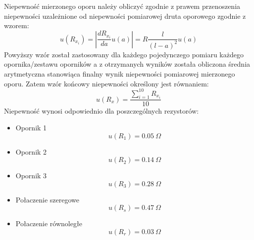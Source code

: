\documentclass[a4paper,12pts]{article}
\begin{document}
	Niepewność mierzonego oporu należy obliczyć zgodnie z prawem przenoszenia niepewności uzależnione od niepewności pomiarowej druta oporowego zgodnie z wzorem:
	\begin{equation}
		u(R_{{x}_i}) = \left| \frac{dR_{{x}_i}}{da} u(a) \right| = R \frac{l}{(l-a)^2} u(a)
	\end{equation}
	Powyższy wzór został zastosowany dla każdego pojedynczego pomiaru każdego opornika/zestawu oporników a z otrzymanych wyników została obliczona średnia arytmetyczna stanowiąca finalny wynik niepewności pomiarowej mierzonego oporu. Zatem wzór końcowy niepewności określony jest równaniem:
	\begin{equation}
		u(R_x) = \frac{\sum_{i = 1}^{10} R_{{x}_i}}{10}
	\end{equation}
	Niepewność wynosi odpowiednio dla poszczególnych rezystorów:
	\begin{itemize}
		\item Opornik 1
			\begin{equation}
				u(R_1) = 0.05~\Omega
			\end{equation}
		
		\item Opornik 2
			\begin{equation}
				u(R_2) = 0.14~\Omega
			\end{equation}
			
		\item Opornik 3
			\begin{equation}
				u(R_3) = 0.28~\Omega
			\end{equation}
			
		\item Połaczenie szeregowe
			\begin{equation}
				u(R_s) = 0.47~\Omega
			\end{equation}
			
		\item Połaczenie równoległe
			\begin{equation}
				u(R_r) = 0.03~\Omega
			\end{equation}
	\end{itemize}
\end{document}
